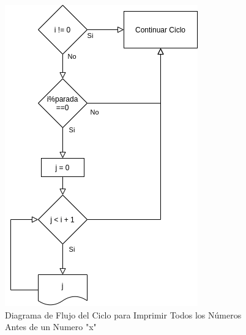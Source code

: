 \documentclass[12pt]{article}
\begin{document}
\begin{figure}[H]
    \caption{Diagrama de Flujo del Ciclo para Imprimir Todos los Números Antes de un Numero "x"}
    \centering
    \includegraphics[scale=0.5]{programa3_ciclo2.png}
\end{figure}
\end{document}
